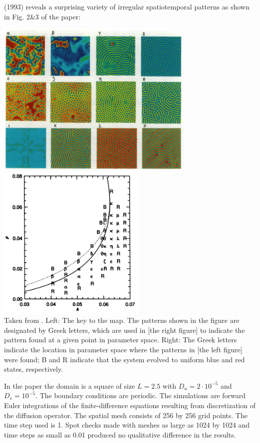 \textcite{pear93} (1993) reveals a surprising variety of irregular spatiotemporal patterns
as shown in Fig. 2\&3 of the paper:

\begin{center}
\includegraphics[height=7.5cm]{python_codes/fieldstone_171/images/pear93a}
\includegraphics[height=7.5cm]{python_codes/fieldstone_171/images/pear93b}\\
{\captionfont Taken from \cite{pear93}. Left: The key to the map. The patterns 
shown in the figure are designated by Greek letters, which are used in 
[the right figure] to indicate the pattern found at a given point in parameter space.
Right: The Greek letters indicate the location in parameter
space where the patterns in [the left figure] were found; B and R indicate that
the system evolved to uniform blue and red states, respectively.
} 
\end{center}

In the paper the domain is a square of size $L=2.5$ with $D_u=2\cdot 10^{-5}$
and $D_v=10^{-5}$. The boundary conditions are periodic.
The simulations are forward Euler integrations of the finite-difference equations 
resulting from discretization of the diffusion operator. The spatial mesh consists of 256 by 256
grid points. The time step used is 1. Spot checks made with meshes as large as 1024 by
1024 and time steps as small as 0.01 produced no qualitative difference in the results.

